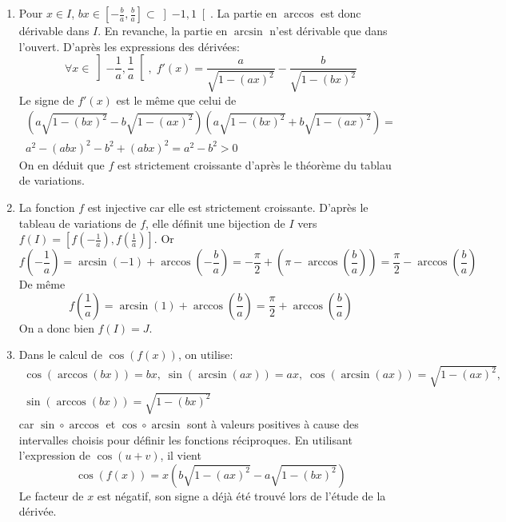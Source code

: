 \begin{enumerate}
  \item Pour $x\in I$, $bx \in \left[ -\frac{b}{a}, \frac{b}{a}\right]\subset \left]-1,1 \right[$. La partie en $\arccos$ est donc dérivable dans $I$. En revanche, la partie en $\arcsin$ n'est dérivable que dans l'ouvert. D'après les expressions des dérivées:
\begin{displaymath}
\forall x\in \left] -\frac{1}{a},\frac{1}{a}\right[,\;
f'(x) = \frac{a}{\sqrt{1-(ax)^2}} - \frac{b}{\sqrt{1-(bx)^2}}
\end{displaymath}
Le signe de $f'(x)$ est le même que celui de
\begin{multline*}
\left( a\sqrt{1-(bx)^2} -b\sqrt{1-(ax)^2}\right) \left( a\sqrt{1-(bx)^2} +b\sqrt{1-(ax)^2}\right) = \\
a^2 - (abx)^2 - b^2 + (abx)^2 = a^2 - b^2 > 0
\end{multline*}
On en déduit que $f$ est strictement croissante d'après le théorème du tablau de variations.

  \item La fonction $f$ est injective car elle est strictement croissante. D'après le tableau de variations de $f$, elle définit une bijection de $I$ vers $f(I)=\left[ f(-\frac{1}{a}), f(\frac{1}{a})\right] $. Or
\begin{displaymath}
  f(-\frac{1}{a}) = \arcsin(-1) + \arccos(-\frac{b}{a})
  = -\frac{\pi}{2} + \left( \pi - \arccos(\frac{b}{a})\right) = \frac{\pi}{2} - \arccos(\frac{b}{a}) 
\end{displaymath}
De même 
\begin{displaymath}
  f(\frac{1}{a}) = \arcsin(1) + \arccos(\frac{b}{a}) = \frac{\pi}{2} + \arccos(\frac{b}{a}) 
\end{displaymath}
On a donc bien $f(I)=J$.

  \item Dans le calcul de $\cos(f(x))$, on utilise:
\begin{multline*}
  \cos(\arccos(bx)) = bx,\; \sin(\arcsin(ax)) = ax,\; \cos(\arcsin(ax)) = \sqrt{1-(ax)^2},\;\\
  \sin(\arccos(bx)) = \sqrt{1-(bx)^2}
\end{multline*}
car $\sin \circ \arccos$ et $\cos \circ \arcsin$ sont à valeurs positives à cause des intervalles choisis pour définir les fonctions réciproques. En utilisant l'expression de $\cos(u+v)$, il vient
\begin{displaymath}
  \cos(f(x)) = x(b \sqrt{1-(ax)^2} - a\sqrt{1-(bx)^2})
\end{displaymath}
Le facteur de $x$ est négatif, son signe a déjà été trouvé lors de l'étude de la dérivée.


\end{enumerate}
